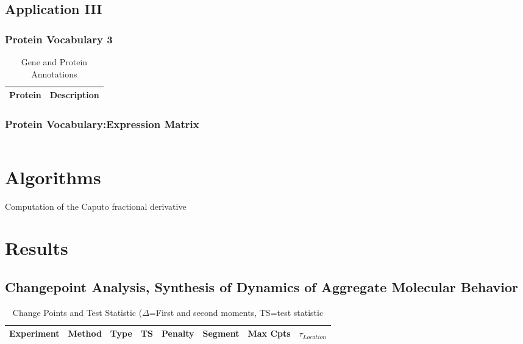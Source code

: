\begin{equation}
\end{equation}

\subsection{Application III}

\subsubsection{Protein Vocabulary 3}

\begin{table}[H]\tiny
\caption{Gene and Protein Annotations}	
	\begin{tabular}{p{1cm}p{6cm}}
		\hline
		Protein & Description \\   
		\hline
	\hline
\end{tabular}
\end{table}

\subsubsection{Protein Vocabulary:Expression Matrix}

\begin{equation}
\end{equation}

\section{Algorithms}

\begin{algorithm}[H]
\footnotesize
\begin{algorithmic}[1]

\end{algorithmic}
\caption{Computation of the Caputo fractional derivative}
	\label{Algorithm_1}
\end{algorithm}

\section{Results}

\subsection{Changepoint Analysis, Synthesis of Dynamics of Aggregate Molecular Behavior}

\begin{table}[H]\tiny
  \caption{Change Points and Test Statistic ($\Delta$=First and second moments, TS=test statistic}
\begin{tabular}{rlp{0.7cm}lllll}
\hline	 
Experiment &Method & Type & TS & Penalty & Segment & Max Cpts & $\tau_{Location}$ \\
\hline
\hline
\end{tabular}
\end{table}

